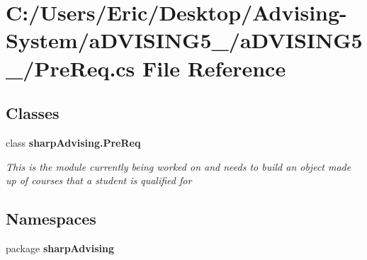 \section{C\+:/\+Users/\+Eric/\+Desktop/\+Advising-\/\+System/a\+D\+V\+I\+S\+I\+N\+G5\+\_/a\+D\+V\+I\+S\+I\+N\+G5\+\_/\+Pre\+Req.cs File Reference}
\label{_pre_req_8cs}
\subsection*{Classes}
\begin{DoxyCompactItemize}
\item 
class {\bf sharp\+Advising.\+Pre\+Req}
\begin{DoxyCompactList}\small\item\em This is the module currently being worked on and needs to build an object made up of courses that a student is qualified for \end{DoxyCompactList}\end{DoxyCompactItemize}
\subsection*{Namespaces}
\begin{DoxyCompactItemize}
\item 
package {\bf sharp\+Advising}
\end{DoxyCompactItemize}
